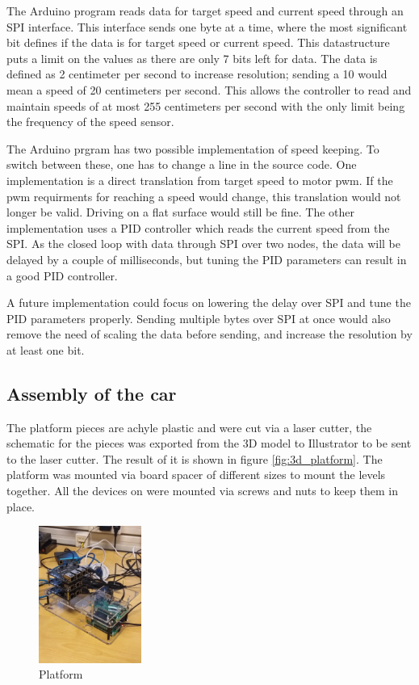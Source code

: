 \documentclass[11pt, titlepage]{article} %
\begin{document}
The Arduino program reads data for target speed and current speed through an SPI interface. This interface sends one byte at a time, where the most significant bit defines if the data is for target speed or current speed. This datastructure puts a limit on the values as there are only 7 bits left for data. The data is defined as 2 centimeter per second to increase resolution; sending a 10 would mean a speed of 20 centimeters per second. This allows the controller to read and maintain speeds of at most 255 centimeters per second with the only limit being the frequency of the speed sensor. 

The Arduino prgram has two possible implementation of speed keeping. To switch between these, one has to change a line in the source code. One implementation is a direct translation from target speed to motor pwm. If the pwm requirments for reaching a speed would change, this translation would not longer be valid. Driving on a flat surface would still be fine. The other implementation uses a PID controller which reads the current speed from the SPI. As the closed loop with data through SPI over two nodes, the data will be delayed by a couple of milliseconds, but tuning the PID parameters can result in a good PID controller.

A future implementation could focus on lowering the delay over SPI and tune the PID parameters properly. Sending multiple bytes over SPI at once would also remove the need of scaling the data before sending, and increase the resolution by at least one bit.

\subsection{Assembly of the car}


The platform pieces are achyle plastic and were cut via a laser cutter, the schematic for the pieces was exported from the 3D model to Illustrator to be sent to the laser cutter. The result of it is shown in figure \ref{fig:3d_platform}. The platform was mounted via board spacer of different sizes to mount the levels together. All the devices on were mounted via screws and nuts to keep them in place. 


\begin{figure}
	\includegraphics[width=0.3\textwidth]{platform_assembely.jpg}
	\caption{Platform}
	\label{fig:platform_ass}
\end{figure}
\end{document}
